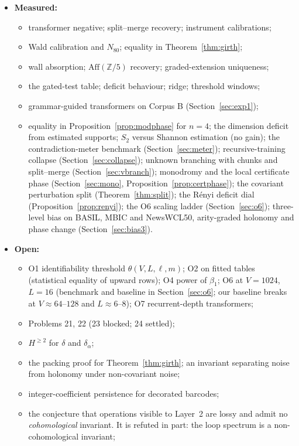 \documentclass[11pt]{article}
\theoremstyle{definition}
\theoremstyle{remark}
\newcommand{\Z}{\mathbb{Z}}
\newcommand{\Aff}{\mathrm{Aff}}
\begin{document}
\begin{itemize}
  \item \textbf{Measured:}
  \begin{itemize}
    \item transformer negative; split--merge recovery; instrument calibrations;
    \item Wald calibration and $N_{80}$; equality in Theorem~\ref{thm:girth};
    \item wall absorption; $\Aff(\Z/5)$ recovery; graded-extension uniqueness;
    \item the gated-test table; deficit behaviour; ridge; threshold windows;
    \item grammar-guided transformers on Corpus B (Section~\ref{sec:exp1});
    \item equality in Proposition~\ref{prop:modphase} for $n=4$; the dimension deficit from estimated supports; $S_2$ versus Shannon estimation (no gain); the contradiction-meter benchmark (Section~\ref{sec:meter}); recursive-training collapse (Section~\ref{sec:collapse}); unknown branching with chunks and split--merge (Section~\ref{sec:vbranch}); monodromy and the local certificate phase (Section~\ref{sec:mono}, Proposition~\ref{prop:certphase}); the covariant perturbation split (Theorem~\ref{thm:split}); the R\'enyi deficit dial (Proposition~\ref{prop:renyi}); the O6 scaling ladder (Section~\ref{sec:o6}); three-level bias on BASIL, MBIC and NewsWCL50, arity-graded holonomy and phase change (Section~\ref{sec:bias3}).
  \end{itemize}
  \item \textbf{Open:}
  \begin{itemize}
    \item O1 identifiability threshold $\theta(V,L,\ell,m)$; O2 on fitted tables (statistical equality of upward rows); O4 power of $\beta_1$; O6 at $V=1024$, $L=16$ (benchmark and baseline in Section~\ref{sec:o6}; our baseline breaks at $V\approx64$--$128$ and $L\approx6$--$8$); O7 recurrent-depth transformers;
    \item Problems 21, 22 (23 blocked; 24 settled);
    \item $H^{\ge2}$ for $\delta$ and $\delta_\alpha$;
    \item the packing proof for Theorem~\ref{thm:girth}; an invariant separating noise from holonomy under non-covariant noise;
    \item integer-coefficient persistence for decorated barcodes;
    \item the conjecture that operations visible to Layer~2 are lossy and admit no \emph{cohomological} invariant. It is refuted in part: the loop spectrum is a non-cohomological invariant;

\end{itemize}
\end{itemize}
\end{document}
